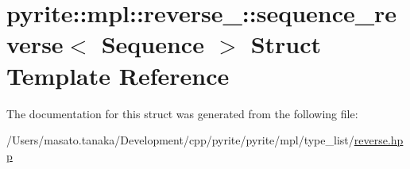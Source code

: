 \hypertarget{structpyrite_1_1mpl_1_1reverse___1_1sequence__reverse}{}\section{pyrite\+:\+:mpl\+:\+:reverse\+\_\+\+:\+:sequence\+\_\+reverse$<$ Sequence $>$ Struct Template Reference}
\label{structpyrite_1_1mpl_1_1reverse___1_1sequence__reverse}


The documentation for this struct was generated from the following file\+:\begin{DoxyCompactItemize}
\item 
/\+Users/masato.\+tanaka/\+Development/cpp/pyrite/pyrite/mpl/type\+\_\+list/\mbox{\hyperlink{reverse_8hpp}{reverse.\+hpp}}\end{DoxyCompactItemize}

